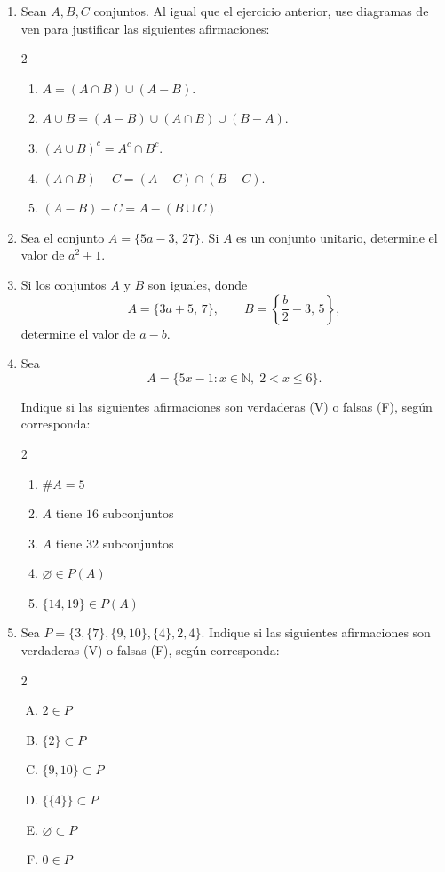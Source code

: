 \documentclass[12pt]{article}
\begin{document}
\begin{enumerate}
\item Sean $A, B, C$ conjuntos. Al igual que el ejercicio anterior, use diagramas de ven para justificar las siguientes afirmaciones:
\begin{multicols}{2}
    \begin{enumerate}
    \item
    $
    A = (A \cap B) \cup (A - B).
    $

    \item
    $
    A \cup B = (A - B) \cup (A \cap B) \cup (B - A).
    $

    \item $(A\cup B)^c = A^c\cap B^c.$


    \item
    $
    (A \cap B)- C = (A - C)\cap (B - C).
    $

    \item
    $
    (A - B)-C = A - (B \cup C).
    $
\end{enumerate}
\end{multicols}







\item Sea el conjunto $A=\{5a-3,\,27\}.$
Si $A$ es un conjunto unitario, determine el valor de $a^2+1$.
\item Si los conjuntos $A$ y $B$ son iguales, donde
\[
A=\{3a+5,\,7\}, \qquad B=\left\{\frac{b}{2}-3,\,5\right\},
\]
determine el valor de $a-b$.

\item Sea
\[
A=\{5x-1: x \in \mathbb{N},\; 2 < x \leq 6\}.
\]

Indique si las siguientes afirmaciones son verdaderas (V) o falsas (F), según corresponda:
\begin{multicols}{2}
    \begin{enumerate}
\item $\#A=5$ 
\item $A$ tiene $16$ subconjuntos
\item $A$ tiene $32$ subconjuntos
\item $\varnothing \in P(A)$
\item$\{14,19\} \in P(A)$
\end{enumerate}
\end{multicols}


\item Sea $
P=\{3,\{7\},\{9,10\},\{4\},2,4\}.$
Indique si las siguientes afirmaciones son verdaderas (V) o falsas (F), según corresponda:
\begin{multicols}{2}
  \begin{enumerate}[A)]
\item $2 \in P$
\item  $\{2\} \subset P$
\item $\{9,10\} \subset P$
\item $\{\{4\}\} \subset P$
\item $\varnothing \subset P$
\item $0\in P$
\end{enumerate}  
\end{multicols}


\end{enumerate}
\end{document}
